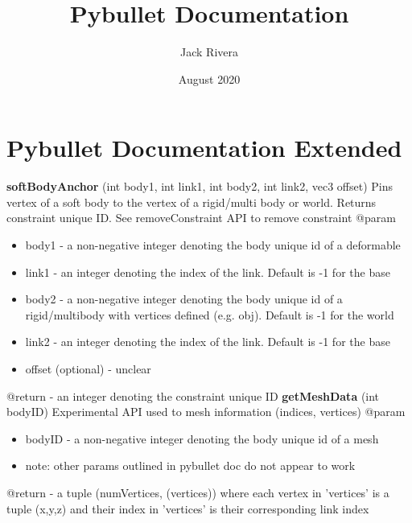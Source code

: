 \documentclass{article}
\title{Pybullet Documentation}
\author{Jack Rivera}
\date{August 2020}
\begin{document}
\section{Pybullet Documentation Extended}

\vspace{0.4cm}
\textbf{softBodyAnchor} (int body1, int link1, int body2, int link2, vec3 offset)
\newline Pins vertex of a soft body to the vertex of a rigid/multi body or world. Returns constraint unique ID. See removeConstraint API to remove constraint
\vspace{0.2cm}
\newline @param
\begin{itemize}
    \item body1 - a non-negative integer denoting the body unique id of a deformable
    \item link1 - an integer denoting the index of the link. Default is -1 for the base
    \item body2 - a non-negative integer denoting the body unique id of a rigid/multibody with vertices defined (e.g. obj). Default is -1 for the world
    \item link2 - an integer denoting the index of the link. Default is -1 for the base
    \item offset (optional) - unclear
\end{itemize}
@return - an integer denoting the constraint unique ID
\vspace{0.4cm}
\newline
\textbf{getMeshData} (int bodyID)
\newline Experimental API used to mesh information (indices, vertices)
\vspace{0.2cm}
\newline @param
\begin{itemize}
    \item bodyID - a non-negative integer denoting the body unique id of a mesh
    \item note: other params outlined in pybullet doc do not appear to work
\end{itemize}
@return - a tuple (numVertices, (vertices)) where each vertex in 'vertices' is a tuple (x,y,z) and their index in 'vertices' is their corresponding link index
\end{document}

